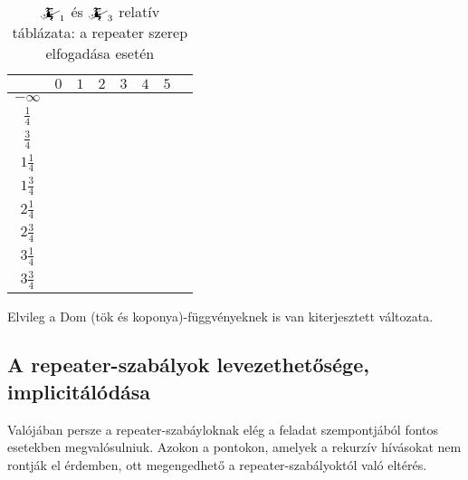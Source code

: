 \documentclass{article}
\newcommand{\blk}{\cellcolor{darkgray}}
\newcommand{\red}{\cellcolor{red!33}}
\newcommand{\grn}{\cellcolor{green!33}}
\newcommand{\nothing}{\text{\raisebox{0.4em}{\rotatebox{180}{$\curvearrowleft$}}}}%
\newcommand{\just}[1]{\boxed{#1}}%
\newcommand{\incl}{\mathbf{incl}}
\newcommand{\excl}{\mathbf{excl}}
\newcommand{\currymainfun}[1]{\mathwitch_{#1}}
\begin{document}
	\begin{table}[H]
		\caption*{$\currymainfun1$ és $\currymainfun3$ relatív táblázata: a repeater szerep elfogadása esetén}
		\centering
		\begin{tabular}{c||c|c|c|c|c|c|c|}
				&	$0$		&	$1$		&	$2$		&	$3$		&	$4$		&	$5$		\\\hline\hline
		$-\infty$	&	\nothing	&	\nothing	&	\nothing	&	\nothing	&	\nothing	&	\nothing	\\\hline
		$\frac14$	&	\nothing	&	\nothing	&	\nothing	&	\nothing	&	\nothing	&	\grn\just\incl	\\\hline
		$\frac34$	&	\red\just\excl	&	\nothing	&	\nothing	&	\nothing	&	\nothing	&	\grn\just\incl	\\\hline
		$1\frac14$	&	\red\just\excl	&	\nothing	&	\nothing	&	\nothing	&	\grn\just\incl	&	\blk		\\\hline
		$1\frac34$	&	\blk		&	\red\just\excl	&	\nothing	&	\nothing	&	\grn\just\incl	&	\blk		\\\hline
		$2\frac14$	&	\blk		&	\red\just\excl	&	\nothing	&	\grn\just\incl	&	\blk		&	\blk		\\\hline
		$2\frac34$	&	\blk		&	\blk		&	\red\just\excl	&	\grn\just\incl	&	\blk		&	\blk		\\\hline
		$3\frac14$	&	\blk		&	\blk		&	\blk		&	\blk		&	\blk		&	\blk		\\\hline
		$3\frac34$	&	\blk		&	\blk		&	\blk		&	\blk		&	\blk		&	\blk		\\\hline
		\end{tabular}
	\end{table}


	Elvileg a Dom (tök és koponya)-függvényeknek is van kiterjesztett változata.

	\subsection{A repeater-szabályok levezethetősége, implicitálódása}

	Valójában persze a repeater-szabáyloknak elég a feladat szempontjából fontos esetekben megvalósulniuk. Azokon a pontokon, amelyek a rekurzív hívásokat nem rontják el érdemben, ott megengedhető a repeater-szabályoktól való eltérés.
\end{document}
